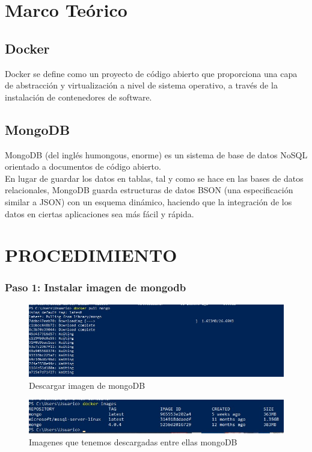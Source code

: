 \documentclass[preprint,12pt]{elsarticle}
\begin{document}
\section{Marco Teórico}


\subsection {\textbf{Docker}}
Docker se define como un proyecto de código abierto que proporciona una capa de abstracción y virtualización a nivel de sistema operativo, a través de la instalación de contenedores de software.

\subsection {\textbf{MongoDB}}
MongoDB (del inglés humongous, enorme) es un sistema de base de datos NoSQL orientado a documentos de código abierto.\\
En lugar de guardar los datos en tablas, tal y como se hace en las bases de datos relacionales, MongoDB guarda estructuras de datos BSON (una especificación similar a JSON) con un esquema dinámico, haciendo que la integración de los datos en ciertas aplicaciones sea más fácil y rápida.

\section{PROCEDIMIENTO}

\subsubsection{\textbf{Paso 1: Instalar imagen de mongodb}}
\begin{figure}[H]
	\begin{center}
		\includegraphics[width=12cm]{./IMAGENES/foto1} 
		\caption{Descargar imagen de mongoDB}
	\end{center}
\end{figure}

\begin{figure}[H]
	\begin{center}
		\includegraphics[width=12cm]{./IMAGENES/foto2} 
		\caption{Imagenes que tenemos descargadas entre ellas mongoDB}
	\end{center}
\end{figure}
\end{document}
